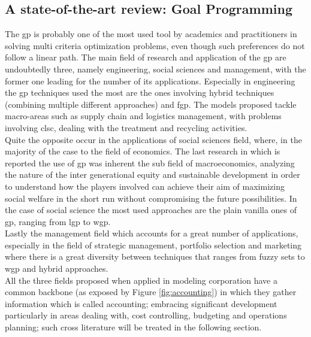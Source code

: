 \begin{doublespace}
\pagebreak 

\section{A state-of-the-art review: Goal Programming}
The \gls{gp} is probably one of the most used tool by academics and practitioners in solving multi criteria optimization problems, even though such preferences do not follow a linear path\cite{Romero2014}\cite{Schniederjans1995}. The main field of research and application of the \gls{gp} are undoubtedly three, namely engineering, social sciences and management\cite{Colapinto2017a}, with the former one leading for the number of its applications.
Especially in engineering the \gls{gp} techniques used the most are the ones involving hybrid techniques (combining multiple different  approaches) and \gls{fgp}. The models proposed tackle macro-areas such as supply chain and logistics management, with problems involving \gls{clsc}, dealing with the treatment and recycling activities\cite{Zarandi2011}.
\\
Quite the opposite occur in the applications of social sciences field, where, in the majority of the case to the field of economics. The last research in which is reported the use of \gls{gp} was inherent the sub field of macroeconomics, analyzing the nature of the inter generational equity and sustainable development in order to understand how the players involved can achieve their aim of maximizing social welfare in the short run without compromising the future possibilities. In the case of social science the most used approaches are the plain vanilla ones of \gls{gp}, ranging from \gls{lgp} to \gls{wgp}.
\\
Lastly the management field which accounts for a great number of applications, especially in the field of strategic management, portfolio selection and marketing where there is a great diversity between techniques that ranges from fuzzy sets\cite{Trenado2014} to \gls{wgp} and hybrid approaches.
\\
All the three fields proposed when applied in modeling corporation have a common backbone (as exposed by Figure \ref{fig:accounting})  in which they gather information which is called accounting; embracing significant development particularly in areas dealing with, cost controlling, budgeting and operations planning; such cross literature will be treated in the following section.

\begin{figure}
\begin{center}
\end{center}
\end{figure}
\end{doublespace}
